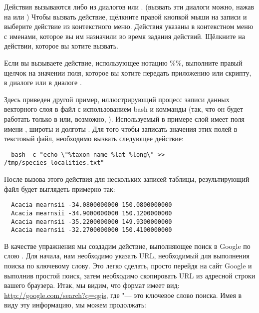 Действия вызываются либо из диалогов  или
. (вызвать эти диалоги можно, нажав на
 или
) Чтобы вызвать
действие, щёлкните правой кнопкой мыши на записи и выберите действие из
контекстного меню. Действия указаны в контекстном меню с именами, которое
вы им назначили во время задания действий. Щёлкните на действии, которое
вы хотите вызвать.

Если вы вызываете действие, использующее нотацию \%\%, выполните правый
щелчок на значении поля, которое вы хотите передать приложению или скрипту,
в диалоге  или в диалоге .

Здесь приведен другой пример, иллюстрирующий процесс записи данных векторного
слоя в файл с использованием bash и комманды  (так, что он
будет работать только в \nix или, возможно, \osx). Используемый в примере
слой имеет поля имени , широты  и долготы
. Для того чтобы записать значения этих полей в текстовый файл,
необходимо вызвать следующее действие:

\begin{verbatim}
  bash -c "echo \"%taxon_name %lat %long\" >> /tmp/species_localities.txt"
\end{verbatim}

После вызова этого действия для нескольких записей таблицы, результирующий
файл будет выглядеть примерно так:

\begin{verbatim}
  Acacia mearnsii -34.0800000000 150.0800000000
  Acacia mearnsii -34.9000000000 150.1200000000
  Acacia mearnsii -35.2200000000 149.9300000000
  Acacia mearnsii -32.2700000000 150.4100000000
\end{verbatim}

В качестве упражнения мы создадим действие, выполняющее поиск в Google по
слою . Для начала, нам необходимо указать URL, необходимый
для выполнения поиска по ключевому слову. Это легко сделать, просто перейдя
на сайт Google и выполнив простой поиск, затем необходимо скопировать URL
из адресной строки вашего браузера. Итак, мы видим, что формат имеет вид:
\url{http://google.com/search?q=qgis}, где \usertext{\qg} "--- это ключевое
слово поиска. Имея в виду эту информацию, мы можем продолжать:

